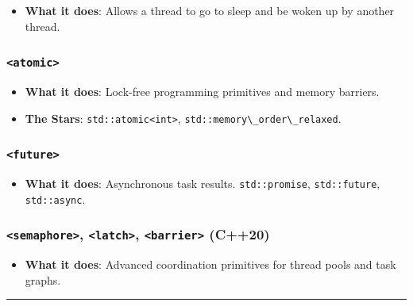 \begin{itemize}
\tightlist
\item
  \textbf{What it does}: Allows a thread to go to sleep and be woken up
  by another thread.
\end{itemize}

\hypertarget{atomic}{%
\subsubsection{\texorpdfstring{\texttt{\textless{}atomic\textgreater{}}}{\textless atomic\textgreater{}}}\label{atomic}}

\begin{itemize}
\tightlist
\item
  \textbf{What it does}: Lock-free programming primitives and memory
  barriers.
\item
  \textbf{The Stars}: \passthrough{\lstinline!std::atomic<int>!},
  \passthrough{\lstinline!std::memory\_order\_relaxed!}.
\end{itemize}

\hypertarget{future}{%
\subsubsection{\texorpdfstring{\texttt{\textless{}future\textgreater{}}}{\textless future\textgreater{}}}\label{future}}

\begin{itemize}
\tightlist
\item
  \textbf{What it does}: Asynchronous task results.
  \passthrough{\lstinline!std::promise!},
  \passthrough{\lstinline!std::future!},
  \passthrough{\lstinline!std::async!}.
\end{itemize}

\hypertarget{semaphore-latch-barrier-c20}{%
\subsubsection{\texorpdfstring{\texttt{\textless{}semaphore\textgreater{}},
\texttt{\textless{}latch\textgreater{}},
\texttt{\textless{}barrier\textgreater{}}
(C++20)}{\textless semaphore\textgreater, \textless latch\textgreater, \textless barrier\textgreater{} (C++20)}}\label{semaphore-latch-barrier-c20}}

\begin{itemize}
\tightlist
\item
  \textbf{What it does}: Advanced coordination primitives for thread
  pools and task graphs.
\end{itemize}

\begin{center}\rule{0.5\linewidth}{0.5pt}\end{center}
